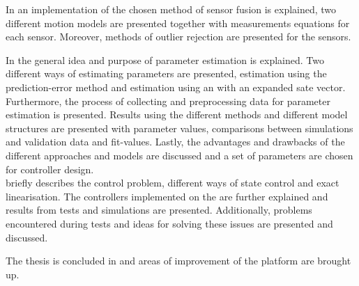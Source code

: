 In  an implementation of the chosen method of sensor fusion is explained, two different motion models are presented together with measurements equations for each \abbrROV sensor. Moreover, methods of outlier rejection are presented for the sensors.

In  the general idea and purpose of parameter estimation is explained. Two different ways of estimating parameters are presented, estimation using the prediction-error method and estimation using an \abbrEKF with an expanded sate vector. Furthermore, the process of collecting and preprocessing data for parameter estimation is presented. Results using the different methods and different model structures are presented with parameter values, comparisons between simulations and validation data and fit-values. Lastly, the advantages and drawbacks of the different approaches and models are discussed and a set of parameters are chosen for controller design.\\

 briefly describes the control problem, different ways of state control and exact linearisation. The controllers implemented on the \abbrROV are further explained and results from tests and simulations are presented. Additionally, problems encountered during tests and ideas for solving these issues are presented and discussed.

The thesis is concluded in  and areas of improvement of the \abbrROV platform are brought up. 
